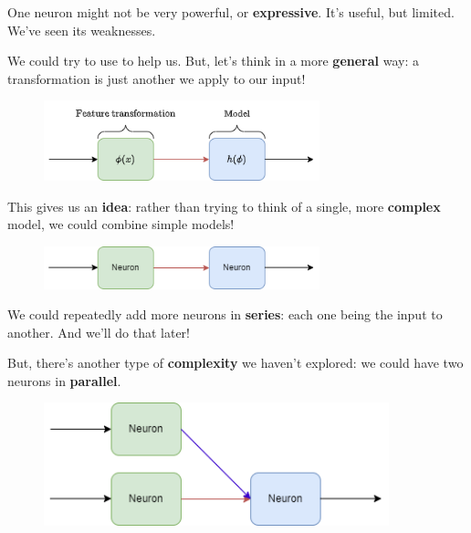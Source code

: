         One neuron might not be very powerful, or \textbf{expressive}. It's useful, but limited. We've seen its weaknesses.
       
        We could try to use  to help us. But, let's think in a more \textbf{general} way: a transformation is just another  we apply to our input!
       
        \begin{figure}[H]
            \centering
            \includegraphics[width=80mm,scale=0.4]{images/nn_images/feature_transform.png}
        \end{figure}
       
        This gives us an \textbf{idea}: rather than trying to think of a single, more \textbf{complex} model, we could combine  simple models!
       
        \begin{figure}[H]
        \centering
            \includegraphics[width=80mm,scale=0.4]{images/nn_images/two_neurons.png}
        \end{figure}
        
        We could repeatedly add more neurons in \textbf{series}: each one being the input to another. And we'll do that later!
        
        But, there's another type of \textbf{complexity} we haven't explored: we could have two neurons in \textbf{parallel}.
        
        \begin{figure}[H]
        \centering
            \includegraphics[width=100mm,scale=0.4]{images/nn_images/three_neurons.png}
        \end{figure}
        
